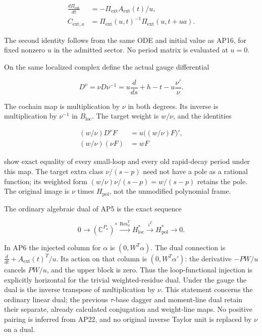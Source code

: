 \[
\begin{aligned}
\frac{d\Pi_{\mathrm{ext}}}{dt}&=-\Pi_{\mathrm{ext}}A_{\mathrm{ext}}(t)/u,\\
C_{\mathrm{ext},a}&=\Pi_{\mathrm{ext}}(u,t)^{-1}\Pi_{\mathrm{ext}}(u,t+ua).
\end{aligned}
\tag{AP19b}
\]

The second identity follows from the same ODE and initial value as AP16, for fixed nonzero \(u\) in the admitted sector. No period matrix is evaluated at \(u=0\).

On the same localized complex define the actual gauge differential

\[
D^\nu=\nu D\nu^{-1}
=u\frac{d}{ds}+h-t-u\frac{\nu'}{\nu}.
\tag{AP20}
\]

The cochain map is multiplication by \(\nu\) in both degrees. Its inverse is multiplication by \(\nu^{-1}\) in \(B_{\mathrm{loc}}\). The target weight is \(w/\nu\), and the identities

\[
\begin{aligned}
(w/\nu)D^\nu F&=u\bigl((w/\nu)F\bigr)',\\
(w/\nu)(\nu F)&=wF
\end{aligned}
\tag{AP21}
\]

show exact equality of every small-loop and every old rapid-decay period under this map. The target extra class \(\nu/(s-p)\) need not have a pole as a rational function; its weighted form \((w/\nu)\nu/(s-p)=w/(s-p)\) retains the pole. The original image is \(\nu\) times \(H_{\mathrm{pol}}\), not the unmodified polynomial frame.

The ordinary algebraic dual of AP5 is the exact sequence

\[
0\longrightarrow(\mathbb C^{P_\nu})^*
\xrightarrow{\operatorname{Res}_w^T}H_{\mathrm{loc}}^*
\xrightarrow{i^T}H_{\mathrm{pol}}^*\longrightarrow0.
\tag{AP22}
\]

In AP6 the injected column for \(\alpha\) is \((0,W^T\alpha)\). The dual connection is \(\frac{d}{dt}+A_{\mathrm{ext}}(t)^T/u\). Its action on that column is \((0,W^T\alpha')\): the derivative \(-P W/u\) cancels \(P W/u\), and the upper block is zero. Thus the loop-functional injection is explicitly horizontal for the trivial weighted-residue dual. Under the gauge the dual is the inverse transpose of multiplication by \(\nu\). This statement concerns the ordinary linear dual; the previous \(\tau\)-base dagger and moment-line dual retain their separate, already calculated conjugation and weight-line maps. No positive pairing is inferred from AP22, and no original inverse Taylor unit is replaced by \(\nu\) on a dual.

